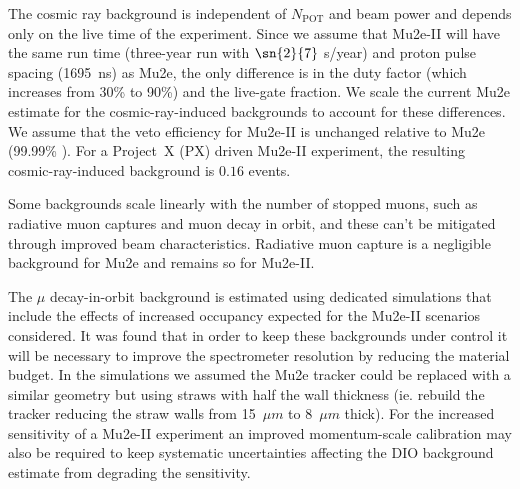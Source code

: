 The cosmic ray background is independent of $N_{\mathrm{POT}}$ and
beam power and depends only on the live time of the experiment. Since
we assume that Mu2e-II will have the same run time (three-year run
with $\sn{2}{7}$ s/year) and proton pulse spacing (1695~ns) as Mu2e,
the only difference is in the duty factor (which increases from 30\%
to 90\%) and the live-gate fraction. We scale the current Mu2e
estimate for the cosmic-ray-induced backgrounds to account for these
differences.  We assume that the veto efficiency for Mu2e-II is
unchanged relative to Mu2e (99.99\% ). For a Project~X (PX) driven
Mu2e-II experiment, the resulting cosmic-ray-induced background is
$0.16$ events.

Some backgrounds scale linearly with the number of stopped muons, such
as radiative muon captures and muon decay in orbit, and these can't be
mitigated through improved beam characteristics.  Radiative muon
capture is a negligible background for Mu2e and remains so for
Mu2e-II.

The $\mu$ decay-in-orbit background is estimated using dedicated simulations that include the effects of increased occupancy expected for the Mu2e-II scenarios considered.  It was found that in order to keep these backgrounds under control it will be necessary to improve the spectrometer resolution by reducing the material budget.  In the simulations we assumed the Mu2e tracker could be replaced with a similar geometry but using straws with half the wall thickness (ie. rebuild the tracker reducing the straw walls from 15~$\mu m$ to 8~$\mu m$ thick).  For the increased sensitivity of a Mu2e-II experiment an improved momentum-scale calibration may also be required to keep systematic uncertainties affecting the DIO background estimate from degrading the sensitivity.

